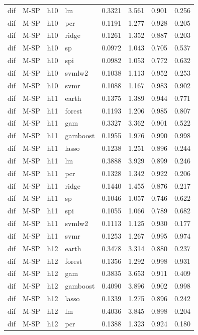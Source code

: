 \begin{ThreePartTable}
\begin{longtable}[t]{llclcccc}
dif & M-SP & h10 & lm & 0.3321 & 3.561 & 0.901 & 0.256\\
dif & M-SP & h10 & pcr & 0.1191 & 1.277 & 0.928 & 0.205\\
dif & M-SP & h10 & ridge & 0.1261 & 1.352 & 0.887 & 0.203\\
dif & M-SP & h10 & sp & 0.0972 & 1.043 & 0.705 & 0.537\\
dif & M-SP & h10 & spi & 0.0982 & 1.053 & 0.772 & 0.632\\
dif & M-SP & h10 & svmlw2 & 0.1038 & 1.113 & 0.952 & 0.253\\
dif & M-SP & h10 & svmr & 0.1088 & 1.167 & 0.983 & 0.902\\
\addlinespace
dif & M-SP & h11 & earth & 0.1375 & 1.389 & 0.944 & 0.771\\
dif & M-SP & h11 & forest & 0.1193 & 1.206 & 0.985 & 0.807\\
dif & M-SP & h11 & gam & 0.3327 & 3.362 & 0.901 & 0.522\\
dif & M-SP & h11 & gamboost & 0.1955 & 1.976 & 0.990 & 0.998\\
dif & M-SP & h11 & lasso & 0.1238 & 1.251 & 0.896 & 0.244\\
dif & M-SP & h11 & lm & 0.3888 & 3.929 & 0.899 & 0.246\\
dif & M-SP & h11 & pcr & 0.1328 & 1.342 & 0.922 & 0.206\\
dif & M-SP & h11 & ridge & 0.1440 & 1.455 & 0.876 & 0.217\\
dif & M-SP & h11 & sp & 0.1046 & 1.057 & 0.746 & 0.622\\
dif & M-SP & h11 & spi & 0.1055 & 1.066 & 0.789 & 0.682\\
dif & M-SP & h11 & svmlw2 & 0.1113 & 1.125 & 0.930 & 0.177\\
dif & M-SP & h11 & svmr & 0.1253 & 1.267 & 0.995 & 0.974\\
\addlinespace
dif & M-SP & h12 & earth & 0.3478 & 3.314 & 0.880 & 0.237\\
dif & M-SP & h12 & forest & 0.1356 & 1.292 & 0.998 & 0.931\\
dif & M-SP & h12 & gam & 0.3835 & 3.653 & 0.911 & 0.409\\
dif & M-SP & h12 & gamboost & 0.4090 & 3.896 & 0.902 & 0.998\\
dif & M-SP & h12 & lasso & 0.1339 & 1.275 & 0.896 & 0.242\\
dif & M-SP & h12 & lm & 0.4036 & 3.845 & 0.898 & 0.204\\
dif & M-SP & h12 & pcr & 0.1388 & 1.323 & 0.924 & 0.180\\

\end{longtable}
\end{ThreePartTable}

